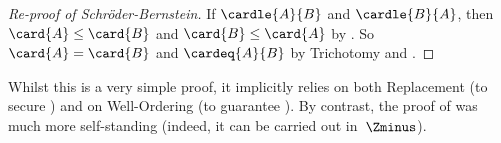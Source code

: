 \documentclass[../../../include/open-logic-section]{subfiles}
\begin{document}
\begin{proof}[Re-proof of Schr\"oder-Bernstein]
If $\cardle{A}{B}$ and $\cardle{B}{A}$, then $\card{A} \leq \card{B}$
and $\card{B} \leq \card{A}$ by . So
$\card{A} = \card{B}$ and $\cardeq{A}{B}$ by Trichotomy and
.
\end{proof}
\noindent
Whilst this is a very simple proof, it implicitly relies on both
Replacement (to secure
) and on
Well-Ordering (to guarantee ). By
contrast, the proof of  was much
more self-standing (indeed, it can be carried out in~$\Zminus$).
\end{document}
